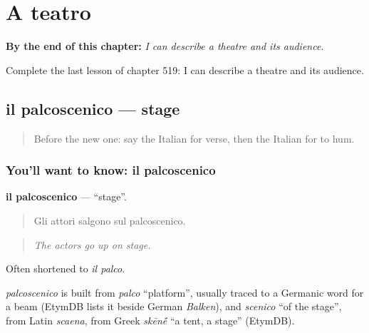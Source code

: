 
\chapter{A teatro}
\label{ch:it-a-teatro}

\begin{chapteropening}
\textbf{By the end of this chapter:} \emph{I can describe a theatre and its audience.}

Complete the last lesson of chapter 519: I can describe a theatre and its audience.
\end{chapteropening}

\section[il palcoscenico]{il palcoscenico — stage}

\label{lesson:IT-C519-palcoscenico}



\begin{quote}
Before the new one: say the Italian for verse, then the Italian for to hum.
\end{quote}

\subsection*{You'll want to know: il palcoscenico}
\textbf{il palcoscenico} — \textquotedblleft{}stage\textquotedblright{}.

\begin{quote}
Gli attori salgono sul palcoscenico.
\end{quote}

\begin{quote}
\emph{The actors go up on stage.}
\end{quote}

Often shortened to \emph{il palco}.

\begin{cousinweb}
\emph{palcoscenico} is built from \emph{palco} \textquotedblleft{}platform\textquotedblright{}, usually traced to a Germanic word for a beam (EtymDB lists it beside German \emph{Balken}), and \emph{scenico} \textquotedblleft{}of the stage\textquotedblright{}, from Latin \emph{scaena}, from Greek \emph{skēn\'{\={e}}} \textquotedblleft{}a tent, a stage\textquotedblright{} (EtymDB).
\end{cousinweb}

